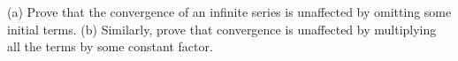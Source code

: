 \begin{hwsection}
\begin{hw}
(a) Prove that the convergence of an infinite series is unaffected by omitting
some initial terms. (b) Similarly, prove that convergence is unaffected by
multiplying all the terms by some constant factor.
\end{hw}


\end{hwsection}
